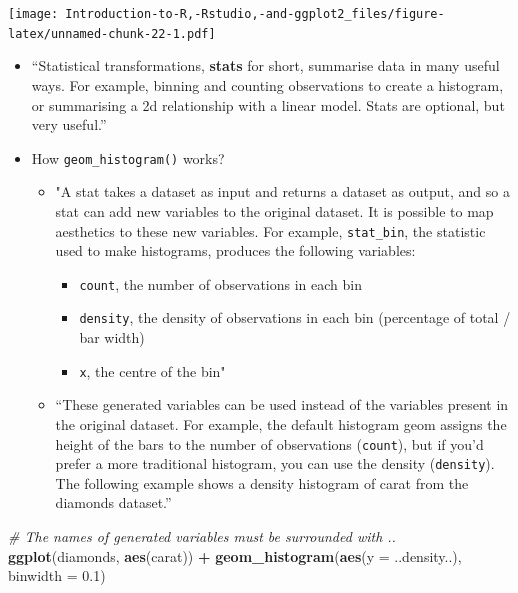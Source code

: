 \documentclass[]{book}
\newenvironment{Shaded}{\begin{snugshade}}{\end{snugshade}}
\newcommand{\CommentTok}[1]{\textcolor[rgb]{0.56,0.35,0.01}{\textit{#1}}}
\newcommand{\DataTypeTok}[1]{\textcolor[rgb]{0.13,0.29,0.53}{#1}}
\newcommand{\FloatTok}[1]{\textcolor[rgb]{0.00,0.00,0.81}{#1}}
\newcommand{\KeywordTok}[1]{\textcolor[rgb]{0.13,0.29,0.53}{\textbf{#1}}}
\newcommand{\NormalTok}[1]{#1}
\newcommand{\OperatorTok}[1]{\textcolor[rgb]{0.81,0.36,0.00}{\textbf{#1}}}
\newcommand{\StringTok}[1]{\textcolor[rgb]{0.31,0.60,0.02}{#1}}
\providecommand{\tightlist}{%
  \setlength{\itemsep}{0pt}\setlength{\parskip}{0pt}}
\begin{document}
\texttt{[image: Introduction-to-R,-Rstudio,-and-ggplot2\_files/figure-latex/unnamed-chunk-22-1.pdf]}

\begin{itemize}
\item
  ``Statistical transformations, \textbf{stats} for short, summarise data in many useful ways. For example, binning and counting observations to create a histogram, or summarising a 2d relationship with a linear model. Stats are optional, but very useful.'' \citep{ggplot2}
\item
  How \texttt{geom\_histogram()} works?

  \begin{itemize}
  \tightlist
  \item
    "A stat takes a dataset as input and returns a dataset as output, and so a stat can add new variables to the original dataset. It is possible to map aesthetics to these new variables. For example, \texttt{stat\_bin}, the statistic used to make histograms, produces the following variables:

    \begin{itemize}
    \tightlist
    \item
      \texttt{count}, the number of observations in each bin
    \item
      \texttt{density}, the density of observations in each bin (percentage of total / bar
      width)
    \item
      \texttt{x}, the centre of the bin" \citep{ggplot2}
    \end{itemize}
  \item
    ``These generated variables can be used instead of the variables present in
    the original dataset. For example, the default histogram geom assigns the height of the bars to the number of observations (\texttt{count}), but if you'd prefer a more traditional histogram, you can use the density (\texttt{density}). The following example shows a density histogram of carat from the diamonds dataset.'' \citep{ggplot2}
  \end{itemize}
\end{itemize}

\begin{Shaded}
\begin{Highlighting}[]
\CommentTok{# The names of generated variables must be surrounded with ..}
 \KeywordTok{ggplot}\NormalTok{(diamonds, }\KeywordTok{aes}\NormalTok{(carat)) }\OperatorTok{+}\StringTok{ }\KeywordTok{geom_histogram}\NormalTok{(}\KeywordTok{aes}\NormalTok{(}\DataTypeTok{y =}\NormalTok{ ..density..), }\DataTypeTok{binwidth =} \FloatTok{0.1}\NormalTok{)}
\end{Highlighting}
\end{Shaded}
\end{document}

